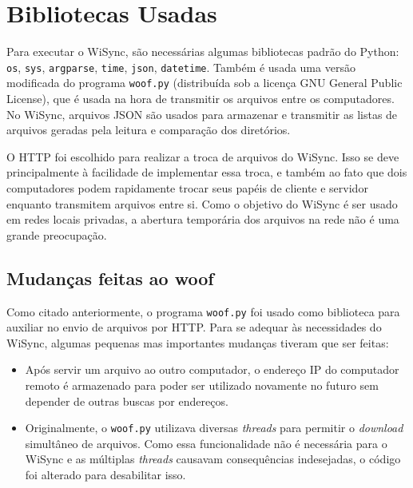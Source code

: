 \documentclass[12pt,a4paper]{ufpr}
\begin{document}
\section{Bibliotecas Usadas}
Para executar o WiSync, são necessárias algumas bibliotecas padrão do Python: \texttt{os}, \texttt{sys}, \texttt{argparse}, \texttt{time}, \texttt{json}, \texttt{datetime}.
Também é usada uma versão modificada do programa \texttt{woof.py} \cite{woof} (distribuída sob a licença GNU General Public License), que é usada na hora de transmitir os arquivos entre os computadores.
No WiSync, arquivos JSON são usados para armazenar e transmitir as listas de arquivos geradas pela leitura e comparação dos diretórios.

O HTTP foi escolhido para realizar a troca de arquivos do WiSync.
Isso se deve principalmente à facilidade de implementar essa troca, e também ao fato que dois computadores podem rapidamente trocar seus papéis de cliente e servidor enquanto transmitem arquivos entre si.
Como o objetivo do WiSync é ser usado em redes locais privadas, a abertura temporária dos arquivos na rede não é uma grande preocupação.

\subsection{Mudanças feitas ao woof}
Como citado anteriormente, o programa \texttt{woof.py} \cite{woof} foi usado como biblioteca para auxiliar no envio de arquivos por HTTP.
Para se adequar às necessidades do WiSync, algumas pequenas mas importantes mudanças tiveram que ser feitas:
\begin{itemize}
  \item Após servir um arquivo ao outro computador, o endereço IP do computador remoto é armazenado para poder ser utilizado novamente no futuro sem depender de outras buscas por endereços.
  \item Originalmente, o \texttt{woof.py} utilizava diversas \textit{threads} para permitir o \textit{download} simultâneo de arquivos. Como essa funcionalidade não é necessária para o WiSync e as múltiplas \textit{threads} causavam consequências indesejadas, o código foi alterado para desabilitar isso.
\end{itemize}
\end{document}
